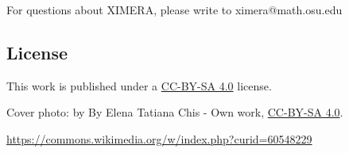 \documentclass{ximera}
\begin{document}
For questions about XIMERA, please write to ximera@math.osu.edu

\subsection{License}
This work is published under a \href{https://creativecommons.org/licenses/by-sa/4.0/deed.en}{CC-BY-SA 4.0} license.

Cover photo:   by By Elena Tatiana Chis - Own work, \href{https://creativecommons.org/licenses/by-sa/4.0/deed.en}{CC-BY-SA 4.0}.  

\href{https://commons.wikimedia.org/w/index.php?curid=60548229}{https://commons.wikimedia.org/w/index.php?curid=60548229}
\end{document}
